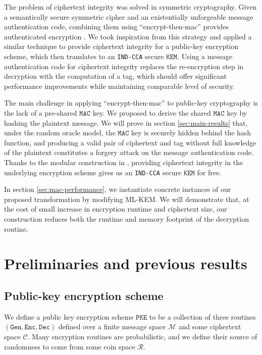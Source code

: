 \documentclass[floatrow,journal=tches,submission]{iacrtrans}
\newcommand{\monospace}{\texttt}
\newcommand{\pke}{\monospace{PKE}}
\newcommand{\keygen}{\monospace{Gen}}
\newcommand{\encrypt}{\monospace{Enc}}
\newcommand{\decrypt}{\monospace{Dec}}
\newcommand{\kem}{\monospace{KEM}}
\newcommand{\mac}{\monospace{MAC}}
\begin{document}
The problem of ciphertext integrity was solved in symmetric cryptography. Given a semantically secure symmetric cipher and an existentially unforgeable message authentication code, combining them using ``encrypt-then-mac'' provides authenticated encryption \cite{bellare2000authenticated}. We took inspiration from this strategy and applied a similar technique to provide ciphertext integrity for a public-key encryption scheme, which then translates to an \monospace{IND-CCA} secure $\kem$. Using a message authentication code for ciphertext integrity replaces the re-encryption step in decryption with the computation of a tag, which should offer significant performance improvements while maintaining comparable level of security.

The main challenge in applying ``encrypt-then-mac'' to public-key cryptography is the lack of a pre-shared $\mac$ key. We proposed to derive the shared $\mac$ key by hashing the plaintext message. We will prove in section \ref{sec:main-results} that, under the random oracle model, the $\mac$ key is securely hidden behind the hash function, and producing a valid pair of ciphertext and tag without full knowledge of the plaintext constitutes a forgery attack on the message authentication code. Thanks to the modular construction in \cite{hofheinz2017modular}, providing ciphertext integrity in the underlying encryption scheme gives us an \monospace{IND-CCA} secure $\kem$ for free.

In section \ref{sec:mac-performance}, we instantiate concrete instances of our proposed transformation by modifying ML-KEM. We will demonstrate that, at the cost of small increase in encryption runtime and ciphertext size, our construction reduces both the runtime and memory footprint of the decryption routine. %

\section{Preliminaries and previous results}

\subsection{Public-key encryption scheme}
We define a public key encryption scheme $\pke$ to be a collection of three routines $(\keygen, \encrypt, \decrypt)$ defined over a finite message space $\mathcal{M}$ and some ciphertext space $\mathcal{C}$. Many encryption routines are probabilistic, and we define their source of randomness to come from some coin space $\mathcal{R}$.
\end{document}
